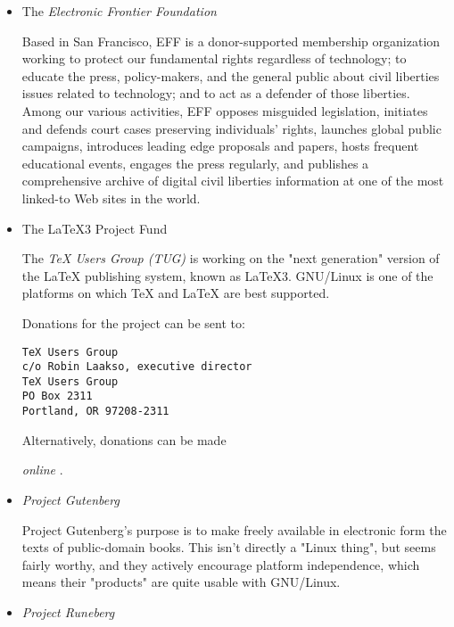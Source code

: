 \documentclass{HOWTO}
\begin{document}
\begin{itemize}
\item The 
\emph{Electronic Frontier Foundation} \texttt{\adourl}
 

Based in San Francisco, EFF is a donor-supported membership organization
working to protect our fundamental rights regardless of technology; to
educate the press, policy-makers, and the general public about civil
liberties issues related to technology; and to act as a defender of 
those liberties. Among our various activities, EFF opposes misguided
legislation, initiates and defends court cases preserving individuals'
rights, launches global public campaigns, introduces leading edge
proposals and papers, hosts frequent educational events, engages the
press regularly, and publishes a comprehensive archive of digital civil
liberties information at one of the most linked-to Web sites in the
world.



\item The LaTeX3 Project Fund 

 
The 
\emph{TeX Users Group (TUG)} \texttt{\adpurl}
 is
working on the "next generation" version of the LaTeX publishing
system, known as LaTeX3.  GNU/Linux is one of the platforms on which TeX
and LaTeX are best supported.

 Donations for the project can be sent to:
\begin{tscreen}
\begin{verbatim}
TeX Users Group
c/o Robin Laakso, executive director
TeX Users Group
PO Box 2311
Portland, OR 97208-2311
\end{verbatim}
\end{tscreen}


Alternatively, donations can be made 

\emph{online} \texttt{\adqurl}
.



\item  
\emph{Project Gutenberg} \texttt{\adrurl}
 

Project Gutenberg's purpose is to make freely available in electronic
form the texts of public-domain books.  This isn't directly a "Linux
thing", but seems fairly worthy, and they actively encourage platform
independence, which means their "products" are quite usable with GNU/Linux.



\item  
\emph{Project Runeberg} \texttt{\adsurl}
 

\end{itemize}
\end{document}
